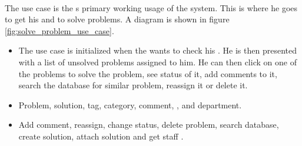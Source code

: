 \paragraph{\ucsolproblem[c]} The use case \ucsolproblem{} is the \astaff{}s primary working usage of the system. This is where he goes to get his \todolist{} and to solve problems. A diagram is shown in figure \ref{fig:solve_problem_use_case}.

\begin{itemize}
\item {} The use case is initialized when the \astaff[] wants to check his \todolist[]. He is then presented with a list of unsolved problems assigned to him. He can then click on one of the problems to solve the problem, see status of it, add comments to it, search the database for similar problem, reassign it or delete it. 

\item {} Problem, solution, tag, category, comment, \client[], \staff[] and department. 

\item {} Add comment, reassign, change status, delete problem, search database, create solution, attach solution and get staff \todolist{}.
\end{itemize}

